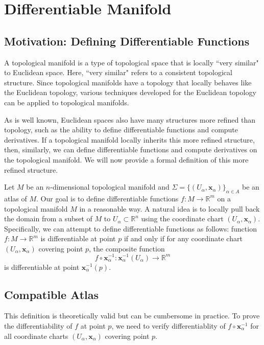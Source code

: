\documentclass{report}
\begin{document}
\section{Differentiable Manifold}
\subsection{Motivation: Defining Differentiable Functions}
A topological manifold is a type of topological space that is locally ``very similar" to Euclidean space. Here, ``very similar" refers to a consistent topological structure. Since topological manifolds have a topology that locally behaves like the Euclidean topology, various techniques developed for the Euclidean topology can be applied to topological manifolds. 

As is well known, Euclidean spaces also have many structures more refined than topology, such as the ability to define differentiable functions and compute derivatives. If a topological manifold locally inherits this more refined structure, then, similarly, we can define differentiable functions and compute derivatives on the topological manifold. We will now provide a formal definition of this more refined structure.

Let $M$ be an $n$-dimensional topological manifold and $\Sigma=\{(U_\alpha,\mathbf{x}_\alpha)\}_{\alpha\in
A}$ be an atlas of $M$. Our goal is to define differentiable functions $f:M\to \mathbb{R}^m$ on a topological manifold $M$ in a reasonable way. A natural idea is to locally pull back the domain from a subset of $M$ to $U_\alpha\subset\mathbb{R}^n$ using the coordinate chart $(U_\alpha,\mathbf{x}_\alpha)$. Specifically, we can attempt to define differentiable functions as follows: function $f:M\to \mathbb{R}^m$ is differentiable at point $p$ if and only if for any coordinate chart $(U_\alpha,\mathbf{x}_\alpha)$ covering point $p$, the composite function
\[
    f\circ \mathbf{x}_\alpha^{-1}:\mathbf{x}_\alpha^{-1}\left(U_\alpha\right)\longrightarrow \mathbb{R}^m
\]
is differentiable at point $\mathbf{x}^{-1}_\alpha(p)$.

\subsection{Compatible Atlas}
This definition is theoretically valid but can be cumbersome in practice. To prove the differentiability of $f$ at point $p$, we need to verify differentiablity of $f\circ \mathbf{x}_\alpha^{-1}$ for all coordinate charts $(U_\alpha,\mathbf{x}_\alpha)$ covering point $p$. 
\end{document}

